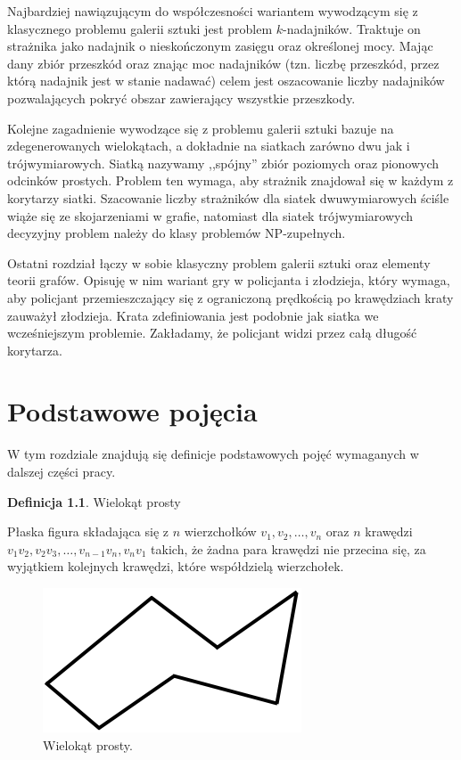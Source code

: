 \documentclass[brudnopis]{xmgr}
\theoremstyle{definition}
\newtheorem{Definicja}{Definicja}
\begin{document}
Najbardziej nawiązującym do współczesności wariantem wywodzącym się z klasycznego problemu galerii sztuki jest problem $k$-nadajników. Traktuje on strażnika jako nadajnik o nieskończonym zasięgu oraz określonej mocy. Mając dany zbiór przeszkód oraz znając moc nadajników (tzn. liczbę przeszkód, przez którą nadajnik jest w stanie nadawać) celem jest oszacowanie liczby nadajników pozwalających pokryć obszar zawierający wszystkie przeszkody.

Kolejne zagadnienie wywodzące się z problemu galerii sztuki bazuje na zdegenerowanych wielokątach, a dokładnie na siatkach zarówno dwu jak i trójwymiarowych. Siatką nazywamy ,,spójny'' zbiór poziomych oraz pionowych odcinków prostych. Problem ten wymaga, aby strażnik znajdował się w każdym z korytarzy siatki. Szacowanie liczby strażników dla siatek dwuwymiarowych ściśle wiąże się ze skojarzeniami w grafie, natomiast dla siatek trójwymiarowych decyzyjny problem należy do klasy problemów NP-zupełnych.

Ostatni rozdział łączy w sobie klasyczny problem galerii sztuki oraz elementy teorii grafów. Opisuję w nim wariant gry w policjanta i złodzieja, który wymaga, aby policjant przemieszczający się z ograniczoną prędkością po krawędziach kraty zauważył złodzieja. Krata zdefiniowania jest podobnie jak siatka we wcześniejszym problemie. Zakładamy, że policjant widzi przez całą długość korytarza.


\chapter{Podstawowe pojęcia}
W tym rozdziale znajdują się definicje podstawowych pojęć wymaganych w dalszej części pracy.

\begin{Definicja}{Wielokąt prosty}

  Płaska figura składająca się z $n$ wierzchołków $v_1, v_2,\ldots, v_n$ oraz $n$ krawędzi $v_1v_2, v_2v_3, \ldots, v_{n-1}v_n,v_nv_1$ takich, że żadna para krawędzi nie przecina się, za wyjątkiem kolejnych krawędzi, które współdzielą wierzchołek.
\end{Definicja}

\begin{figure}[ht!]
  \centering
  \includegraphics{rysunki/wielokat_prosty.png}
    \caption{Wielokąt prosty.}
\end{figure} 
\end{document}
